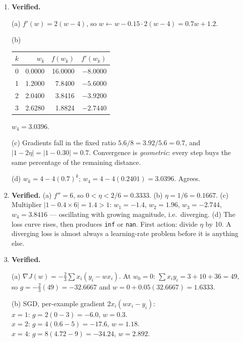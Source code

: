 \documentclass[11pt,a4paper]{article}
\newcommand{\A}[1]{\item[\textbf{#1}]}
\begin{document}
\begin{enumerate}[leftmargin=1.9cm]

\A{U3.26} \textbf{Verified.}
\begin{answerbox}
(a) $f'(w) = 2(w-4)$, so $w \leftarrow w - 0.15\cdot 2(w-4) = 0.7w + 1.2$.

(b) \begin{center}\begin{tabular}{@{}rrrr@{}}\toprule
$k$ & $w_k$ & $f(w_k)$ & $f'(w_k)$\\
\midrule
0 & 0.0000 & 16.0000 & $-8.0000$\\
1 & 1.2000 & 7.8400 & $-5.6000$\\
2 & 2.0400 & 3.8416 & $-3.9200$\\
3 & 2.6280 & 1.8824 & $-2.7440$\\
\bottomrule\end{tabular}\end{center}
$w_4 = \mathbf{3.0396}$.

(c) Gradients fall in the fixed ratio $5.6/8 = 3.92/5.6 = \mathbf{0.7}$, and
$|1 - 2\eta| = |1 - 0.30| = 0.7$. Convergence is \emph{geometric}: every step
buys the same percentage of the remaining distance.

(d) $w_k = 4 - 4(0.7)^k$; $w_4 = 4 - 4(0.2401) = \mathbf{3.0396}$. Agrees.
\end{answerbox}

\A{U3.27} \textbf{Verified.} (a) $f'' = 6$, so $0 < \eta < 2/6 =
\mathbf{0.3333}$. (b) $\eta = 1/6 = \mathbf{0.1667}$. (c) Multiplier
$|1 - 0.4\times6| = 1.4 > 1$: $w_1 = \mathbf{-1.4}$, $w_2 = \mathbf{1.96}$,
$w_3 = \mathbf{-2.744}$, $w_4 = \mathbf{3.8416}$ --- oscillating with growing
magnitude, i.e.\ diverging. (d) The loss curve rises, then produces
\texttt{inf} or \texttt{nan}. First action: divide $\eta$ by 10. A diverging
loss is almost always a learning-rate problem before it is anything else.

\A{U3.28} \textbf{Verified.}
\begin{answerbox}
(a) $\nabla J(w) = -\frac{2}{3}\sum x_i(y_i - wx_i)$. At $w_0 = 0$:
$\sum x_iy_i = 3 + 10 + 36 = 49$, so $g = -\frac23(49) = \mathbf{-32.6667}$ and
$w = 0 + 0.05(32.6667) = \mathbf{1.6333}$.

(b) SGD, per-example gradient $2x_i(wx_i - y_i)$:\\
$x=1$: $g = 2(0-3) = -6.0$, $w = \mathbf{0.3}$.\\
$x=2$: $g = 4(0.6-5) = -17.6$, $w = \mathbf{1.18}$.\\
$x=4$: $g = 8(4.72-9) = -34.24$, $w = \mathbf{2.892}$.


\end{answerbox}
\end{enumerate}
\end{document}
